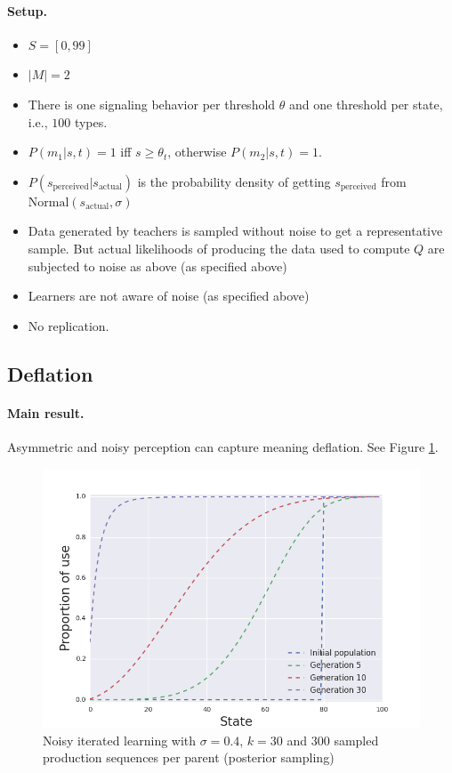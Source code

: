 \documentclass[11pt]{article}
\begin{document}
\paragraph{Setup.}
\begin{itemize}
  \item $S = [0,99]$
  \item $|M| = 2$
  \item There is one signaling behavior per threshold $\theta$ and one threshold per state, i.e., $100$ types.
  \item $P(m_1|s,t) = 1$ iff $s \geq \theta_t$, otherwise $P(m_2|s,t) = 1$.
  \item $P(s_{\text{perceived}} | s_{\text{actual}})$ is the probability density of getting $s_{\text{perceived}}$ from $\text{Normal}(s_{\text{actual}},\sigma)$
  \item Data generated by teachers is sampled without noise to get a representative sample. But actual likelihoods of producing the data used to compute $Q$ are subjected to noise as above (as specified above)
  \item Learners are not aware of noise (as specified above)
  \item No replication.
\end{itemize}




\subsection{Deflation}
\paragraph{Main result.} Asymmetric and noisy perception can capture meaning deflation. See Figure \ref{fig:defl}.

\begin{figure}[ht]
\centering
    \includegraphics[scale=0.5]{../code/plots/deflation-sigma04.png}
  \caption{Noisy iterated learning with $\sigma = 0.4$, $k = 30$ and $300$ sampled production sequences per parent (posterior sampling)}
  \label{fig:defl}
\end{figure}
\end{document}
